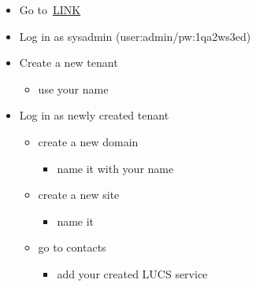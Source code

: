 \documentclass{article}
\begin{document}
\begin{itemize}[noitemsep,topsep=\mdcompacttopsep]%

\item{}Go to~\href{Link}{LINK}%

\item{}Log in as sysadmin (user:admin/pw:1qa2ws3ed)%

\item{}Create a new tenant 

\begin{itemize}[noitemsep,topsep=\mdcompacttopsep]%

\item{}use your name%
\end{itemize}%

\item{}Log in as newly created tenant

\begin{itemize}[noitemsep,topsep=\mdcompacttopsep]%

\item{}create a new domain 

\begin{itemize}[noitemsep,topsep=\mdcompacttopsep]%

\item{}name it with your name%
\end{itemize}%

\item{}create a new site 

\begin{itemize}[noitemsep,topsep=\mdcompacttopsep]%

\item{}name it%
\end{itemize}%

\item{}go to contacts

\begin{itemize}[noitemsep,topsep=\mdcompacttopsep]%

\item{}add your created LUCS service%


\end{itemize}
\end{itemize}
\end{itemize}
\end{document}
